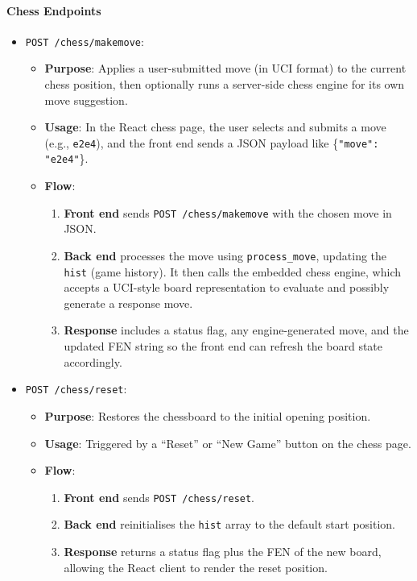 \documentclass[12pt,a4paper]{article}
\begin{document}
\paragraph{Chess Endpoints}
\begin{itemize}
  \item \texttt{POST /chess/makemove}:
    \begin{itemize}
      \item \textbf{Purpose}: Applies a user-submitted move (in UCI format) to the current chess position, then optionally runs a server-side chess engine for its own move suggestion.
      \item \textbf{Usage}: In the React chess page, the user selects and submits a move (e.g., \texttt{e2e4}), and the front end sends a JSON payload like \{\texttt{"move": "e2e4"}\}.
      \item \textbf{Flow}:
        \begin{enumerate}
          \item \textbf{Front end} sends \texttt{POST /chess/makemove} with the chosen move in JSON.
          \item \textbf{Back end} processes the move using \texttt{process\_move}, updating the \texttt{hist} (game history). It then calls the embedded chess engine, which accepts a UCI-style board representation to evaluate and possibly generate a response move.
          \item \textbf{Response} includes a status flag, any engine-generated move, and the updated FEN string so the front end can refresh the board state accordingly.
        \end{enumerate}
    \end{itemize}

  \item \texttt{POST /chess/reset}:
    \begin{itemize}
      \item \textbf{Purpose}: Restores the chessboard to the initial opening position.
      \item \textbf{Usage}: Triggered by a “Reset” or “New Game” button on the chess page.
      \item \textbf{Flow}:
        \begin{enumerate}
          \item \textbf{Front end} sends \texttt{POST /chess/reset}.
          \item \textbf{Back end} reinitialises the \texttt{hist} array to the default start position.
          \item \textbf{Response} returns a status flag plus the FEN of the new board, allowing the React client to render the reset position.
        \end{enumerate}
    \end{itemize}
\end{itemize}
\end{document}

